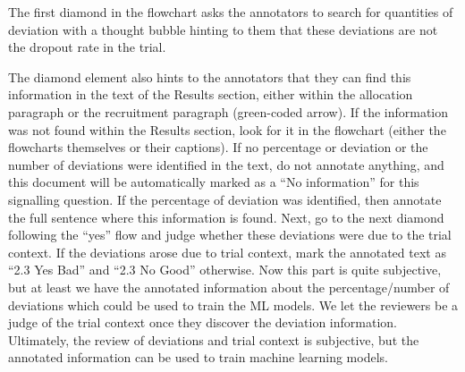 \documentclass[sn-mathphys,Numbered]{sn-jnl}%
\begin{document}
The first diamond in the flowchart asks the annotators to search for quantities of deviation with a thought bubble hinting to them that these deviations are not the dropout rate in the trial.

The diamond element also hints to the annotators that they can find this information in the text of the Results section, either within the allocation paragraph or the recruitment paragraph (green-coded arrow).
If the information was not found within the Results section, look for it in the flowchart (either the flowcharts themselves or their captions).
If no percentage or deviation or the number of deviations were identified in the text, do not annotate anything, and this document will be automatically marked as a ``No information'' for this signalling question.
If the percentage of deviation was identified, then annotate the full sentence where this information is found.
Next, go to the next diamond following the ``yes'' flow and judge whether these deviations were due to the trial context.
If the deviations arose due to trial context, mark the annotated text as ``2.3 Yes Bad'' and ``2.3 No Good'' otherwise.
Now this part is quite subjective, but at least we have the annotated information about the percentage/number of deviations which could be used to train the ML models.
We let the reviewers be a judge of the trial context once they discover the deviation information.
Ultimately, the review of deviations and trial context is subjective, but the annotated information can be used to train machine learning models.
%
%
%
\end{document}
